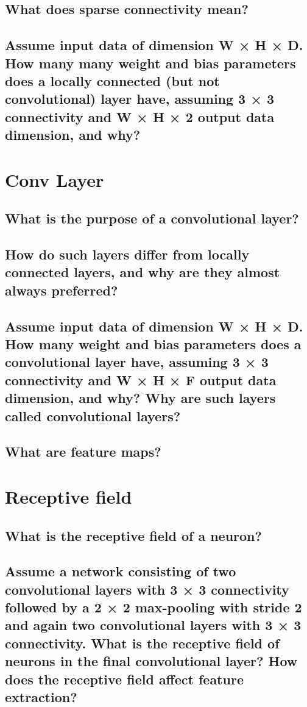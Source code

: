 \subsection{What does sparse connectivity mean?}
\subsection{Assume input data of dimension W × H × D. How many many weight and bias parameters does a locally connected (but not convolutional) layer have, assuming 3 × 3 connectivity and W × H × 2 output data dimension, and why?}

\section{Conv Layer}
\subsection{What is the purpose of a convolutional layer?}
\subsection{How do such layers differ from locally connected layers, and why are they almost always preferred?}
\subsection{Assume input data of dimension W × H × D. How many weight and bias parameters does a convolutional layer have, assuming 3 × 3 connectivity and W × H × F output data dimension, and why? Why are such layers called convolutional layers?}
\subsection{What are feature maps?}

\section{Receptive field}
\subsection{What is the receptive field of a neuron?}
\subsection{Assume a network consisting of two convolutional layers with 3 × 3 connectivity followed by a 2 × 2 max-pooling with stride 2 and again two convolutional layers with 3 × 3 connectivity. What is the receptive field of neurons in the final convolutional layer? How does the receptive field affect feature extraction? }
